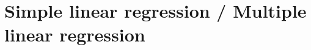 \graphicspath{{Chapters/Indledning/}}

\chapter{Simple linear regression / Multiple linear regression}


